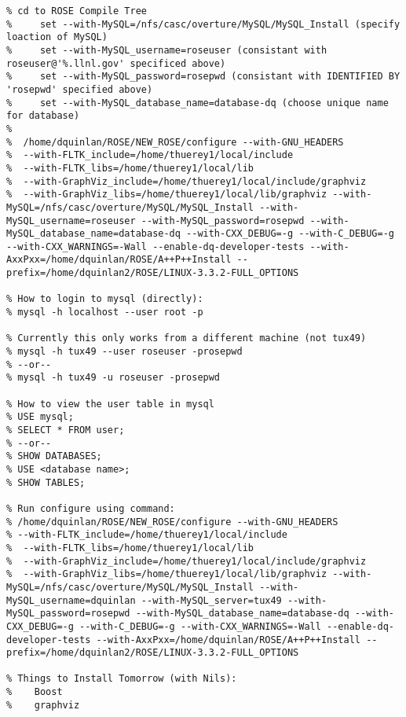 {\begin{verbatim}
% cd to ROSE Compile Tree
%     set --with-MySQL=/nfs/casc/overture/MySQL/MySQL_Install (specify loaction of MySQL)
%     set --with-MySQL_username=roseuser (consistant with roseuser@'%.llnl.gov' specificed above)
%     set --with-MySQL_password=rosepwd (consistant with IDENTIFIED BY 'rosepwd' specified above)
%     set --with-MySQL_database_name=database-dq (choose unique name for database)
%
%  /home/dquinlan/ROSE/NEW_ROSE/configure --with-GNU_HEADERS
%  --with-FLTK_include=/home/thuerey1/local/include
%  --with-FLTK_libs=/home/thuerey1/local/lib
%  --with-GraphViz_include=/home/thuerey1/local/include/graphviz
%  --with-GraphViz_libs=/home/thuerey1/local/lib/graphviz --with-MySQL=/nfs/casc/overture/MySQL/MySQL_Install --with-MySQL_username=roseuser --with-MySQL_password=rosepwd --with-MySQL_database_name=database-dq --with-CXX_DEBUG=-g --with-C_DEBUG=-g --with-CXX_WARNINGS=-Wall --enable-dq-developer-tests --with-AxxPxx=/home/dquinlan/ROSE/A++P++Install --prefix=/home/dquinlan2/ROSE/LINUX-3.3.2-FULL_OPTIONS

% How to login to mysql (directly):
% mysql -h localhost --user root -p

% Currently this only works from a different machine (not tux49)
% mysql -h tux49 --user roseuser -prosepwd
% --or--
% mysql -h tux49 -u roseuser -prosepwd

% How to view the user table in mysql
% USE mysql;
% SELECT * FROM user;
% --or--
% SHOW DATABASES;
% USE <database name>;
% SHOW TABLES;

% Run configure using command:
% /home/dquinlan/ROSE/NEW_ROSE/configure --with-GNU_HEADERS
% --with-FLTK_include=/home/thuerey1/local/include
%  --with-FLTK_libs=/home/thuerey1/local/lib
%  --with-GraphViz_include=/home/thuerey1/local/include/graphviz
%  --with-GraphViz_libs=/home/thuerey1/local/lib/graphviz --with-MySQL=/nfs/casc/overture/MySQL/MySQL_Install --with-MySQL_username=dquinlan --with-MySQL_server=tux49 --with-MySQL_password=rosepwd --with-MySQL_database_name=database-dq --with-CXX_DEBUG=-g --with-C_DEBUG=-g --with-CXX_WARNINGS=-Wall --enable-dq-developer-tests --with-AxxPxx=/home/dquinlan/ROSE/A++P++Install --prefix=/home/dquinlan2/ROSE/LINUX-3.3.2-FULL_OPTIONS

% Things to Install Tomorrow (with Nils):
%    Boost
%    graphviz

\end{verbatim}
} %

